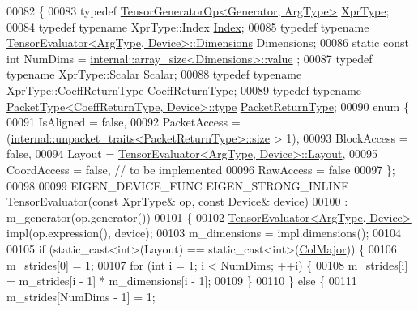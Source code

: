 \begin{DoxyCode}
00082 \{
00083   \textcolor{keyword}{typedef} \hyperlink{class_eigen_1_1_tensor_generator_op}{TensorGeneratorOp<Generator, ArgType>} 
      \hyperlink{class_eigen_1_1_tensor_generator_op}{XprType};
00084   \textcolor{keyword}{typedef} \textcolor{keyword}{typename} XprType::Index \hyperlink{namespace_eigen_a62e77e0933482dafde8fe197d9a2cfde}{Index};
00085   \textcolor{keyword}{typedef} \textcolor{keyword}{typename} \hyperlink{struct_eigen_1_1_tensor_evaluator}{TensorEvaluator<ArgType, Device>::Dimensions}
       Dimensions;
00086   \textcolor{keyword}{static} \textcolor{keyword}{const} \textcolor{keywordtype}{int} NumDims = \hyperlink{struct_eigen_1_1internal_1_1array__size}{internal::array\_size<Dimensions>::value}
      ;
00087   \textcolor{keyword}{typedef} \textcolor{keyword}{typename} XprType::Scalar Scalar;
00088   \textcolor{keyword}{typedef} \textcolor{keyword}{typename} XprType::CoeffReturnType CoeffReturnType;
00089   \textcolor{keyword}{typedef} \textcolor{keyword}{typename} \hyperlink{group___sparse_core___module}{PacketType<CoeffReturnType, Device>::type} 
      \hyperlink{group___sparse_core___module}{PacketReturnType};
00090   \textcolor{keyword}{enum} \{
00091     IsAligned = \textcolor{keyword}{false},
00092     PacketAccess = (\hyperlink{struct_eigen_1_1internal_1_1unpacket__traits}{internal::unpacket\_traits<PacketReturnType>::size}
       > 1),
00093     BlockAccess = \textcolor{keyword}{false},
00094     Layout = \hyperlink{struct_eigen_1_1_tensor_evaluator}{TensorEvaluator<ArgType, Device>::Layout},
00095     CoordAccess = \textcolor{keyword}{false},  \textcolor{comment}{// to be implemented}
00096     RawAccess = \textcolor{keyword}{false}
00097   \};
00098 
00099   EIGEN\_DEVICE\_FUNC EIGEN\_STRONG\_INLINE \hyperlink{struct_eigen_1_1_tensor_evaluator}{TensorEvaluator}(\textcolor{keyword}{const} XprType& op, \textcolor{keyword}{const} Device& 
      device)
00100       : m\_generator(op.generator())
00101   \{
00102     \hyperlink{struct_eigen_1_1_tensor_evaluator}{TensorEvaluator<ArgType, Device>} impl(op.expression(), device);
00103     m\_dimensions = impl.dimensions();
00104 
00105     \textcolor{keywordflow}{if} (static\_cast<int>(Layout) == static\_cast<int>(\hyperlink{group__enums_ggaacded1a18ae58b0f554751f6cdf9eb13a0cbd4bdd0abcfc0224c5fcb5e4f6669a}{ColMajor})) \{
00106       m\_strides[0] = 1;
00107       \textcolor{keywordflow}{for} (\textcolor{keywordtype}{int} i = 1; i < NumDims; ++i) \{
00108         m\_strides[i] = m\_strides[i - 1] * m\_dimensions[i - 1];
00109       \}
00110     \} \textcolor{keywordflow}{else} \{
00111       m\_strides[NumDims - 1] = 1;

\end{DoxyCode}
